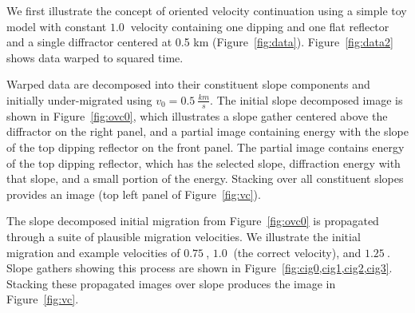 We first illustrate the concept of oriented velocity continuation using a simple toy model \cite[]{landa08,klokov3} with constant $1.0\ $\old{$[km/s]$} velocity containing one dipping and one flat reflector and a single diffractor centered at 0.5 km (Figure~\ref{fig:data}).  Figure~\ref{fig:data2} shows data warped to squared time.  
\par
Warped data are decomposed into their constituent slope components and initially under-migrated
using $v_0=0.5\ \frac{km}{s}$. The initial slope decomposed image is shown in Figure~\ref{fig:ovc0}, which illustrates a slope gather
centered above the diffractor on the right panel, and a partial image containing energy with the slope of the top dipping reflector on the front panel.
The partial image contains energy of the top dipping reflector, which has the selected slope, diffraction energy with that slope, and
a small portion of the energy. Stacking over all constituent slopes provides an image
(top left panel of Figure~\ref{fig:vc}).  
\par
The slope decomposed initial migration from Figure~\ref{fig:ovc0} is propagated through a suite of plausible migration velocities.
We illustrate the initial migration and example velocities of $0.75\ $\old{$[km/s]$}, $1.0\ $\old{$[km/s]$} (the correct velocity), and $1.25\ $\old{$[km/s]$}.
Slope gathers showing this process are shown in Figure~\ref{fig:cig0,cig1,cig2,cig3}. Stacking these propagated images over slope produces
the image in Figure~\ref{fig:vc}.
\par





